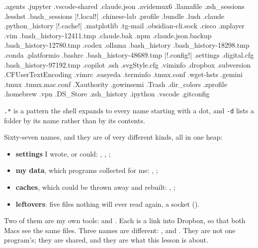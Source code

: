 \documentclass[11pt,a4paper]{article}
\begin{document}
\begin{cmdout}
.agents         .jupyter     .vscode-shared       .claude.json
.avidemux6      .llamafile   .zsh_sessions        .lesshst
.bash_sessions  |!.local!|       .chinese-lab         .profile
.bundle         .lush        .claude              .python_history
|!.cache!|          .matplotlib  .tg-mail             .obsidian-cli.sock
.cisco          .mplayer     .vim                 .bash_history-12411.tmp
.claude.bak     .npm         .claude.json.backup  .bash_history-12780.tmp
.codex          .ollama      .bash_history        .bash_history-18298.tmp
.conda          .platformio  .bashrc              .bash_history-48689.tmp
|!.config!|         .settings    .digital.cfg         .bash_history-97192.tmp
.copilot        .ssh         .svgStyle.cfg        .viminfo
.dropbox        .subversion  .CFUserTextEncoding  .vimrc
.easyeda        .terminfo    .tmux.conf           .wget-hsts
.gemini         .tmux        .tmux.mac.conf       .Xauthority
.gowinsemi      .Trash       .dir_colors          .zprofile
.homebrew       .vpn         .DS_Store            .zsh_history
.ipython        .vscode      .gitconfig
\end{cmdout}

\texttt{.*} is a pattern the shell expands to every name starting with a dot, and \texttt{-d} lists a folder by its name rather than by its contents.

Sixty-seven names, and they are of very different kinds, all in one heap:

\begin{itemize}[leftmargin=1.2em]
  \item \textbf{settings} I wrote, or could: , , ;
  \item \textbf{my data}, which programs collected for me: , ;
  \item \textbf{caches}, which could be thrown away and rebuilt: , ;
  \item \textbf{leftovers}: five  files nothing will ever read again, a socket ().
\end{itemize}

Two of them are my own tools:  and . Each is a link into Dropbox, so that both Macs see the same files. Three names are different: ,  and . They are not one program's; they are shared, and they are what this lesson is about.
\end{document}
